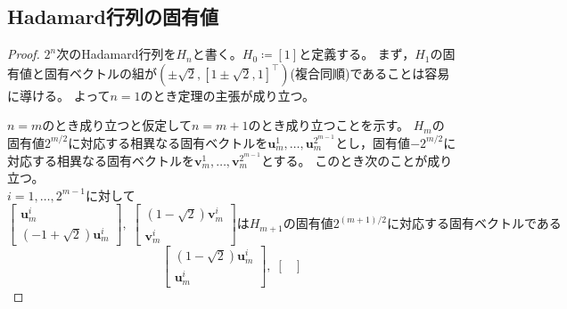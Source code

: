         \subsection{Hadamard行列の固有値}
            \begin{proof}
                \quad\par
                $2^n$次のHadamard行列を$H_n$と書く。$H_0 \coloneq [1]$と定義する。
                まず，$H_1$の固有値と固有ベクトルの組が$(\pm\sqrt{2},[1\pm\sqrt{2},1]^\top)$(複合同順)であることは容易に導ける。
                よって$n=1$のとき定理の主張が成り立つ。
                \par
                $n=m$のとき成り立つと仮定して$n=m+1$のとき成り立つことを示す。
                $H_m$の固有値$2^{m/2}$に対応する相異なる固有ベクトルを$\bm{u}_m^1,\dotsc,\bm{u}_m^{2^{m-1}}$とし，固有値$-2^{m/2}$に対応する相異なる固有ベクトルを$\bm{v}_m^1,\dotsc,\bm{v}_m^{2^{m-1}}$とする。
                このとき次のことが成り立つ。\\
                $i=1,\dotsc,2^{m-1}$に対して
                \begin{equation}
                    \begin{bmatrix}
                        \bm{u}_m^i \\
                        (-1+\sqrt{2})\bm{u}_m^i
                    \end{bmatrix},\;
                    \begin{bmatrix}
                        (1-\sqrt{2})\bm{v}_m^i \\
                        \bm{v}_m^i
                    \end{bmatrix}
                    \text{は}H_{m+1}\text{の固有値}2^{(m+1)/2}\text{に対応する固有ベクトルである}
                \end{equation}
                \begin{equation}
                    \begin{bmatrix}
                        (1-\sqrt{2})\bm{u}_m^i \\
                        \bm{u}_m^i
                    \end{bmatrix},\;
                    \begin{bmatrix}

\end{bmatrix}
\end{equation}
\end{proof}
